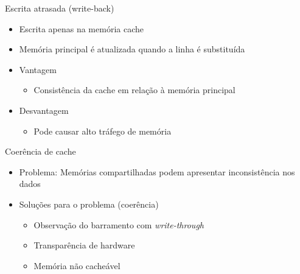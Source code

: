 \documentclass[aspectratio=169,
				xcolor=table]{beamer}
\begin{document}
	\begin{frame}{Escrita atrasada (write-back)}
		\begin{itemize}
			\item Escrita apenas na memória cache
			\vspace{1em}
			\item Memória principal é atualizada quando a linha é substituída
			\vspace{1em}
			\item Vantagem
			\begin{itemize}
				\item Consistência da cache em relação à memória principal
			\end{itemize}
			\vspace{1em}
			\item Desvantagem
			\begin{itemize}
				\item Pode causar alto tráfego de memória				
			\end{itemize}			
		\end{itemize}
	\end{frame}
	

	\begin{frame}{Coerência de cache}
		\begin{itemize}
			\item \alert{Problema:} Memórias compartilhadas podem apresentar inconsistência nos dados
			\vspace{1em}
			\item Soluções para o problema (coerência)
			\begin{itemize}
				\item Observação do barramento com \textit{write-through}
				\item Transparência de hardware
				\item Memória não cacheável
			\end{itemize}
		\end{itemize}
	\end{frame}
	
\end{document}
